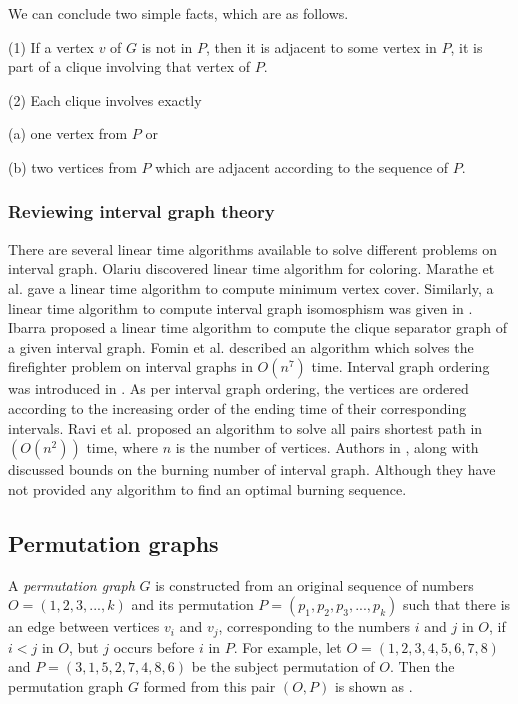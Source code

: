 \begin{corollary}
We can conclude two simple facts, which are as follows.

(1) If a vertex $v$ of $G$ is not in $P$, then it is adjacent to some vertex in $P$, it is part of a clique involving that vertex of $P$.

(2) Each clique involves exactly

\quad (a) one vertex from $P$ or

\quad (b) two vertices from $P$ which are adjacent according to the sequence of $P$.
\end{corollary}

\subsubsection{Reviewing interval graph theory}

There are several linear time algorithms available to solve different problems on interval graph. Olariu \cite{Olariu1991} discovered linear time algorithm for coloring.  Marathe et al. \cite{Marathe1992} gave a linear time algorithm to compute minimum vertex cover. Similarly, a linear time algorithm to compute interval graph isomosphism was given in \cite{Lueker1979}. Ibarra \cite{Ibarra2017} proposed a linear time algorithm to compute the clique separator graph of a given interval graph. Fomin et al. \cite{Fomin2016} described an algorithm which solves the firefighter problem on interval graphs in $O(n^7)$ time. Interval graph ordering was introduced in \cite{Ramalingam1988}. As per interval graph ordering, the vertices are ordered according to the increasing order of the ending time of their corresponding intervals. Ravi et al. \cite{Ravi1992} proposed an algorithm to solve all pairs shortest path in $(O(n^2))$ time, where $n$ is the number of vertices. Authors in \cite{Kamali2019,Kamali2020}, along with \cite{Kare2019} discussed bounds on the burning number of interval graph. Although they have not provided any algorithm to find an optimal burning sequence.

\subsection{Permutation graphs}

A \textit{permutation graph}  $G$ is constructed from an original sequence of numbers $O = (1, 2, 3, . . ., k)$ and its permutation $P = (p_1, p_2, p_3, . . ., p_k)$ such that there is an edge between vertices $v_i$ and $v_j$, corresponding to the numbers $i$ and $j$ in $O$, if $i < j$ in $O$, but $j$ occurs before $i$ in $P$. For example, let $O = (1, 2, 3, 4, 5, 6, 7, 8)$ and $P = (3, 1, 5, 2, 7, 4, 8, 6)$ be the subject permutation of $O$. Then the permutation graph $G$ formed from this pair $(O, P)$ is shown as .


